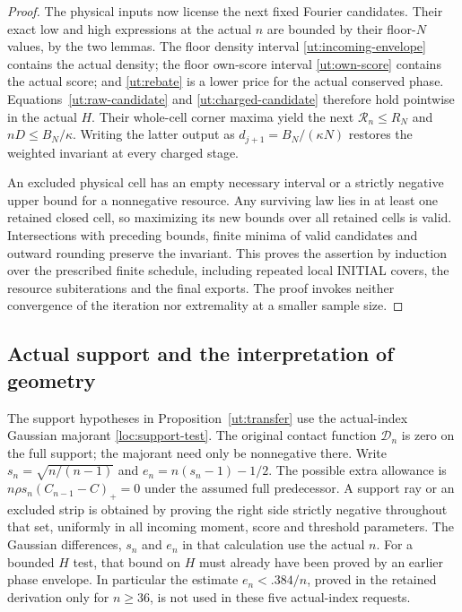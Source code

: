 \begin{proof}
The physical inputs now license the next fixed Fourier candidates.
Their exact low and high expressions at the actual $n$ are bounded
by their floor-$N$ values, by the two lemmas. The floor density
interval \eqref{ut:incoming-envelope} contains the actual density;
the floor own-score interval \eqref{ut:own-score} contains the
actual score; and \eqref{ut:rebate} is a lower price for the actual
conserved phase. Equations~\eqref{ut:raw-candidate} and
\eqref{ut:charged-candidate} therefore hold pointwise in the actual
$H$. Their whole-cell corner maxima yield the next
$\mathcal R_n\le R_N$ and $nD\le B_N/\kappa$.
Writing the latter output as $d_{j+1}=B_N/(\kappa N)$ restores the
weighted invariant at every charged stage.

An excluded physical cell has an empty necessary interval or a
strictly negative upper bound for a nonnegative resource.
Any surviving law lies in at least one retained closed cell, so
maximizing its new bounds over all retained cells is valid.
Intersections with preceding bounds, finite minima of valid
candidates and outward rounding preserve the invariant.
This proves the assertion by induction over the prescribed finite
schedule, including repeated local INITIAL covers, the resource
subiterations and the final exports. The proof invokes neither
convergence of the iteration nor extremality at a smaller sample size.
\end{proof}

\subsection{Actual support and the interpretation of geometry}

The support hypotheses in Proposition~\ref{ut:transfer} use the
actual-index Gaussian majorant \eqref{loc:support-test}.
The original contact function $\mathcal D_n$ is zero on the full
support; the majorant need only be nonnegative there.
Write $s_n=\sqrt{n/(n-1)}$ and $e_n=n(s_n-1)-1/2$.
The possible extra allowance is
$n\rho s_n(C_{n-1}-C)_+=0$ under the assumed full predecessor.
A support ray or an excluded strip is obtained by proving the right
side strictly negative throughout that set, uniformly in all incoming
moment, score and threshold parameters. The Gaussian differences,
$s_n$ and $e_n$ in that calculation use the actual $n$.
For a bounded $H$ test, that bound on $H$ must already have been
proved by an earlier phase envelope. In particular the estimate
$e_n<.384/n$, proved in the retained derivation only for $n\ge36$,
is not used in these five actual-index requests.

